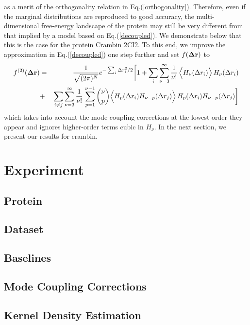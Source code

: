 \documentclass{article}
\begin{document}
as a merit of the orthogonality relation in
Eq.(\ref{orthogonality}). Therefore, even if the marginal
distributions are reproduced to good accuracy, the multi-dimensional
free-energy landscape of the protein may still be very different from
that implied by a model based on Eq.(\ref{decoupled}). We demonstrate
below that this is the case for the protein Crambin 2CI2. To this end,
we improve the approximation in Eq.(\ref{decoupled}) one step
further and set $f({\bf\Delta r})$ to
\begin{eqnarray}
\label{hermite_expansion2}
f^{(2)}({\bf\Delta r}) &=& \frac{1}{\sqrt{(2\pi)^N}} e^{ -\sum_i \Delta
  r_i^2/2} \bigg[ 1 + \sum_i\sum_{\nu=3}^\infty
  \frac{1}{\nu!}\, \Big\langle
  H_\nu(\Delta r_i)\Big\rangle\,H_\nu(\Delta r_i) \nonumber \\
&+&  \sum_{i\ne j}\sum_{\nu=3}^\infty
  \frac{1}{\nu!}\,\sum_{p=1}^{\nu-1} {\nu\choose p} \Big\langle
  H_p(\Delta r_i)H_{\nu-p}(\Delta r_j)\Big\rangle\,H_p(\Delta r_i)H_{\nu-p}(\Delta r_j) \bigg]
\end{eqnarray}
which takes into account the mode-coupling corrections at the lowest
order they appear and ignores higher-order terms cubic in $H_\nu$.
In the next section, we present our results for crambin.
\section{Experiment}

\subsection{Protein}

\subsection{Dataset}

\subsection{Baselines}		%

\subsection{Mode Coupling Corrections} %

\subsection{Kernel Density Estimation}


\begin{thebibliography}{99}


\end{thebibliography}
\end{document}
